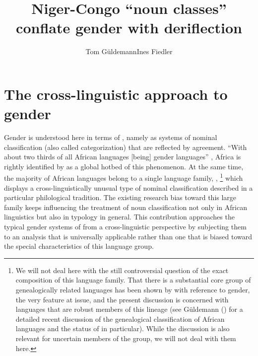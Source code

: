 \documentclass[output=collectionpaper]{langsci/langscibook}
\title{Niger-Congo ``noun classes'' conflate gender with deriflection}
\author{Tom Güldemann\affiliation{Humboldt University Berlin and Max Planck Institute for the Science of Human History}\lastand Ines Fiedler\affiliation{Humboldt University Berlin}}
\begin{document}
\maketitle

\section{The cross-linguistic approach to gender}
\label{sec:Gueld:1}

Gender is understood here in terms of \citet{Corbett1991}, namely as systems of nominal classification (also called categorization) that are reflected by agreement. ``With about two thirds of all African languages [being] gender languages'' \citep[190]{Heine1982}, Africa is rightly identified by \citet[131]{Nichols1992} as a global hotbed of this phenomenon. At the same time, the majority of African languages belong to a single language family, ,%
\footnote{We will not deal here with the still controversial question of the exact composition of this language family. That there is a substantial core group of genealogically related languages has been shown by \citet{Westermann1935} with reference to gender, the very feature at issue, and the present discussion is concerned with languages that are robust members of this lineage (see Güldemann (\citeyear{Gueldemann2018}) for a detailed recent discussion of the genealogical classification of African languages and the status of  in particular). While the discussion is also relevant for uncertain members of the group, we will not deal with them here.%
} %
which displays a cross-linguistically unusual type of nominal classification described in a particular philological tradition. The existing research bias toward this large family keeps influencing the treatment of noun classification not only in African linguistics but also in typology in general. This contribution approaches the typical gender systems of  from a cross-linguistic perspective by subjecting them to an analysis that is universally applicable rather than one that is biased toward the special characteristics of this language group.
\end{document}

